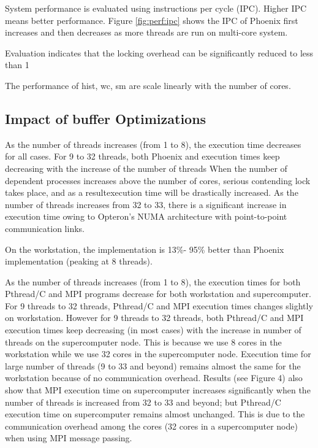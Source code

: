 System performance is evaluated using
instructions per cycle (IPC). Higher IPC means
better performance.
Figure \ref{fig:perf:ipc} shows the IPC of Phoenix first increases 
and then decreases as more threads are run on multi-core system.


{\color{red}\myds }
Evaluation indicates that
the locking overhead can be significantly reduced to less
than 1%





The performance of hist, wc, sm are scale linearly with the number of cores.


\subsection{ Impact of buffer Optimizations}
As the number of threads increases (from 1 to 8), the
execution time decreases for all cases. For 9 to 32 threads,
both Phoenix and \myds execution times keep decreasing with
the increase of the number of threads
When the number of dependent processes increases above the
number of cores, 
serious contending lock takes place,
and as a resultexecution time will be drastically increased. 
As the number of threads increases from 32 to 33, 
there is a significant increase
in execution time owing to Opteron’s NUMA architecture with
point-to-point communication links.

On the workstation, the \myds implementation is 13\%-
95\% better than Phoenix implementation (peaking at 8
threads).

As the number of threads increases (from 1 to 8), the
execution times for both Pthread/C and MPI programs decrease
for both workstation and supercomputer. For 9 threads to 32
threads, Pthread/C and MPI execution times changes slightly
on workstation. However for 9 threads to 32 threads, both
Pthread/C and MPI execution times keep decreasing (in most
cases) with the increase in number of threads on the
supercomputer node. This is because we use 8 cores in the
workstation while we use 32 cores in the supercomputer node.
Execution time for large number of threads (9 to 33 and
beyond) remains almost the same for the workstation because
of no communication overhead. Results (see Figure 4) also
show that MPI execution time on supercomputer increases
significantly when the number of threads is increased from 32
to 33 and beyond; but Pthread/C execution time on
supercomputer remains almost unchanged. This is due to the
communication overhead among the cores (32 cores in a
supercomputer node) when using MPI message passing.

